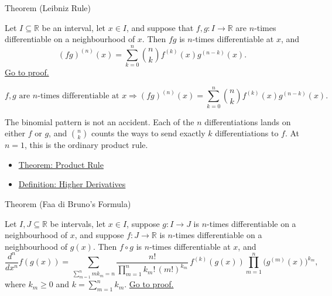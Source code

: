 \begin{theorembox}{Theorem (Leibniz Rule)}
\begin{theorem}
\label{thm:leibniz-rule}
Let \(I\subseteq\mathbb{R}\) be an interval, let \(x\in I\), and suppose
that \(f,g:I\to\mathbb{R}\) are \(n\)-times differentiable on a
neighbourhood of \(x\). Then \(fg\) is \(n\)-times differentiable at \(x\),
and
\[
  (fg)^{(n)}(x)
  =
  \sum_{k=0}^{n}\binom{n}{k}f^{(k)}(x)g^{(n-k)}(x).
\]
\hyperref[prf:leibniz-rule]{Go to proof.}
\end{theorem}
\end{theorembox}

\begin{remark*}
\[
  f,g\text{ are }n\text{-times differentiable at }x
  \Longrightarrow
  (fg)^{(n)}(x)
  =
  \sum_{k=0}^{n}\binom{n}{k}f^{(k)}(x)g^{(n-k)}(x).
\]
\end{remark*}

\begin{remark*}[Interpretation]
The binomial pattern is not an accident. Each of the \(n\) differentiations
lands on either \(f\) or \(g\), and \(\binom{n}{k}\) counts the ways to send
exactly \(k\) differentiations to \(f\). At \(n=1\), this is the ordinary
product rule.
\end{remark*}

\begin{dependencies}
\begin{itemize}
  \item \hyperref[thm:product-rule]{Theorem: Product Rule}
  \item \hyperref[def:higher-derivatives]{Definition: Higher Derivatives}
\end{itemize}
\end{dependencies}

\begin{theorembox}{Theorem (Faa di Bruno's Formula)}
\begin{theorem}
\label{thm:faa-di-bruno}
Let \(I,J\subseteq\mathbb{R}\) be intervals, let \(x\in I\), suppose
\(g:I\to J\) is \(n\)-times differentiable on a neighbourhood of \(x\), and
suppose \(f:J\to\mathbb{R}\) is \(n\)-times differentiable on a neighbourhood
of \(g(x)\). Then \(f\circ g\) is \(n\)-times differentiable at \(x\), and
\[
  \frac{d^n}{dx^n}f(g(x))
  =
  \sum_{\sum_{m=1}^{n}mk_m=n}
  \frac{n!}{\prod_{m=1}^{n}k_m!\,(m!)^{k_m}}\,
  f^{(k)}(g(x))
  \prod_{m=1}^{n}\bigl(g^{(m)}(x)\bigr)^{k_m},
\]
where \(k_m\geq0\) and \(k=\sum_{m=1}^{n}k_m\).
\hyperref[prf:faa-di-bruno]{Go to proof.}
\end{theorem}
\end{theorembox}

